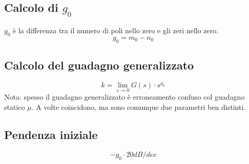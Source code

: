 \documentclass[a4paper]{report}
\begin{document}
\subsection{Calcolo di $g_0$}\label{g0}
$g_0$ \`e la differenza tra il numero di poli nello zero e gli zeri
nello zero.
\begin{equation}
  g_0 = m_0 - n_0
\end{equation}

\subsection{Calcolo del guadagno generalizzato}\label{guadagnogeneralizzato}
\begin{equation}
  k = \lim_{s \to 0} G(s) \cdot s^{g_0}
\end{equation}
Nota: spesso il guadagno generalizzato
\`e erroneamento confuso col guadagno statico $\mu$. A volte coincidono, ma
sono comunque due parametri ben distinti.

\subsection{Pendenza iniziale}
\begin{equation}\label{pendezainiziale}
  - g_0 \cdot 20dB/dec
\end{equation}
\end{document}
